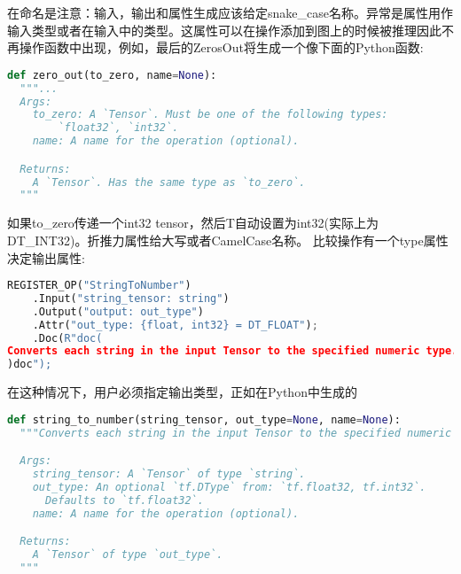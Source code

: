 在命名是注意：输入，输出和属性生成应该给定snake\_case名称。异常是属性用作输入类型或者在输入中的类型。这属性可以在操作添加到图上的时候被推理因此不再操作函数中出现，例如，最后的ZerosOut将生成一个像下面的Python函数:
\begin{lstlisting}[language=Python]
def zero_out(to_zero, name=None):
  """...
  Args:
    to_zero: A `Tensor`. Must be one of the following types:
        `float32`, `int32`.
    name: A name for the operation (optional).

  Returns:
    A `Tensor`. Has the same type as `to_zero`.
  """

\end{lstlisting}
如果to\_zero传递一个int32 tensor，然后T自动设置为int32(实际上为DT\_INT32)。折推力属性给大写或者CamelCase名称。
比较操作有一个type属性决定输出属性:
\begin{lstlisting}[language=Python]
REGISTER_OP("StringToNumber")
    .Input("string_tensor: string")
    .Output("output: out_type")
    .Attr("out_type: {float, int32} = DT_FLOAT");
    .Doc(R"doc(
Converts each string in the input Tensor to the specified numeric type.
)doc");
\end{lstlisting}
在这种情况下，用户必须指定输出类型，正如在Python中生成的
\begin{lstlisting}[language=Python]
def string_to_number(string_tensor, out_type=None, name=None):
  """Converts each string in the input Tensor to the specified numeric type.

  Args:
    string_tensor: A `Tensor` of type `string`.
    out_type: An optional `tf.DType` from: `tf.float32, tf.int32`.
      Defaults to `tf.float32`.
    name: A name for the operation (optional).

  Returns:
    A `Tensor` of type `out_type`.
  """

\end{lstlisting}
